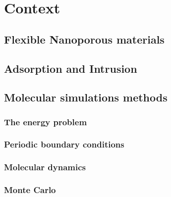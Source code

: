 \documentclass[thesis]{subfiles}
\begin{document}
\chapter{Context}
\startcontents[chapters]
\printpartialtoc

\section{Flexible Nanoporous materials}

\section{Adsorption and Intrusion}

\section{Molecular simulations methods}

\subsection{The energy problem}

\subsection{Periodic boundary conditions}

\subsection{Molecular dynamics}

\subsection{Monte Carlo}
\end{document}
